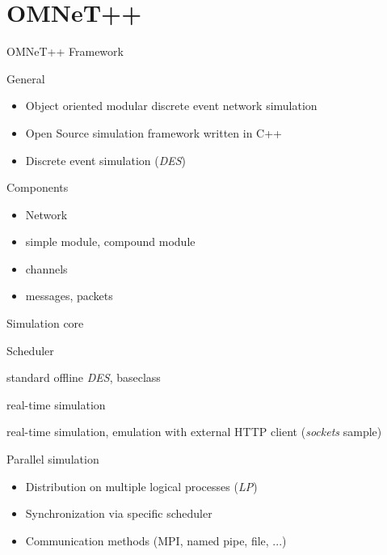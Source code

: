 \section{OMNeT++}
    
\begin{frame}{OMNeT++ Framework}
    \begin{block}{General}
        \begin{itemize}
            \item Object oriented modular discrete event network simulation
            \item Open Source simulation framework written in C++
            \item Discrete event simulation (\emph{DES})
        \end{itemize}
    \end{block}
    
    \begin{block}{Components}
        \begin{itemize}
            \item Network
            \item simple module, compound module
            \item channels
            \item messages, packets
        \end{itemize}
    \end{block}
\end{frame}

\begin{frame}{Simulation core}
    \begin{block}{Scheduler}
        \begin{description}[cRealtimeScheduler]
            \item[cScheduler] standard offline \emph{DES}, baseclass
            \item[cRealtimeScheduler] real-time simulation
            \item[SocketRTScheduler] real-time simulation, emulation with external HTTP client (\emph{sockets} sample)
        \end{description}
    \end{block}
    
    \begin{block}{Parallel simulation}
        \begin{itemize}
            \item Distribution on multiple logical processes (\emph{LP})
            \item Synchronization via specific scheduler
            \item Communication methods (MPI, named pipe, file, ...)
        \end{itemize}
    \end{block}
\end{frame}